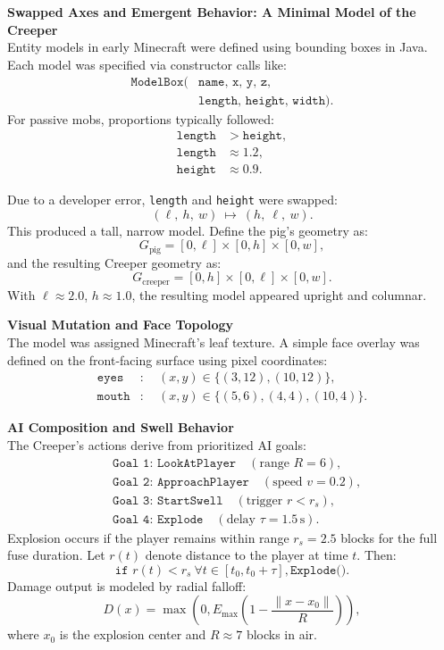 \begin{technical}
{\Large\textbf{Swapped Axes and Emergent Behavior: A Minimal Model of the Creeper}}\\[0.1em]

Entity models in early Minecraft were defined using bounding boxes in Java. 
Each model was specified via constructor calls like:
\[
\begin{aligned}
\texttt{ModelBox(}&\texttt{name, x, y, z,} \\
&\texttt{length, height, width)}.
\end{aligned}
\]
For passive mobs, proportions typically followed:
\begin{align*}
\texttt{length} &> \texttt{height}, \\
\texttt{length} &\approx 1.2, \\
\texttt{height} &\approx 0.9.
\end{align*}

Due to a developer error, \texttt{length} and \texttt{height} were swapped:
\[
(\ell,\ h,\ w)\ \mapsto\ (h,\ \ell,\ w).
\]
This produced a tall, narrow model. Define the pig’s geometry as:
\[
G_{\text{pig}} = [0,\ell] \times [0,h] \times [0,w],
\]
and the resulting Creeper geometry as:
\[
G_{\text{creeper}} = [0,h] \times [0,\ell] \times [0,w].
\]
With \( \ell \approx 2.0 \), \( h \approx 1.0 \), the resulting model appeared upright and columnar.


\vspace{0.3em}
\noindent\textbf{Visual Mutation and Face Topology}\\[0.5em]
The model was assigned Minecraft’s leaf texture. A simple face overlay was defined
on the front-facing surface using pixel coordinates:
\begin{align*}
\texttt{eyes} &:\quad (x,y) \in \{(3,12), (10,12)\}, \\
\texttt{mouth} &:\quad (x,y) \in \{(5,6), (4,4), (10,4)\}.
\end{align*}

\vspace{0.3em}
\noindent\textbf{AI Composition and Swell Behavior}\\[0.5em]
The Creeper’s actions derive from prioritized AI goals:
\begin{align*}
&\texttt{Goal 1: LookAtPlayer} \quad (\text{range } R = 6), \\
&\texttt{Goal 2: ApproachPlayer} \quad (\text{speed } v = 0.2), \\
&\texttt{Goal 3: StartSwell} \quad (\text{trigger } r < r_s), \\
&\texttt{Goal 4: Explode} \quad (\text{delay } \tau = 1.5\,\text{s}).
\end{align*}
Explosion occurs if the player remains within range \( r_s = 2.5 \) blocks for the full
fuse duration. Let \( r(t) \) denote distance to the player at time \( t \). Then:
\[
\texttt{if } r(t) < r_s \ \forall t \in [t_0, t_0 + \tau], \texttt{Explode()}.
\]
Damage output is modeled by radial falloff:
\[
D(x) = \max\left(0, E_{\max}\left(1 - \frac{\|x - x_0\|}{R}\right)\right),
\]
where \( x_0 \) is the explosion center and \( R \approx 7 \) blocks in air.


\end{technical}
